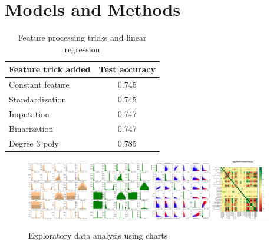 \documentclass[10pt,conference,compsocconf]{IEEEtran}
\begin{document}
\section{Models and Methods}
\begin{table}[!htb]
	\caption{Feature processing tricks and linear regression}	\label{tab:feature_proc}
	\centering\begin{tabular}{|lc|}\hline
		{\bf Feature trick added} & {\bf Test accuracy}\\\hline
		Constant feature & 0.745\\
		Standardization & 0.745\\
		Imputation & 0.747\\
		Binarization & 0.747\\
		Degree 3 poly & 0.785\\\hline
	\end{tabular}
\end{table}

\begin{figure}[!htb]
	\centering \includegraphics[width=100px]{../src/analysis/xy_tr_imp}
	\centering \includegraphics[width=100px]{../src/analysis/hist_te_imp}
	\centering \includegraphics[width=100px]{../src/analysis/hist-scatter-tr-imp-0}
	\centering \includegraphics[width=100px]{../src/analysis/correlation}
	\caption{Exploratory data analysis using charts}
	\label{fig:data}
\end{figure}
\end{document}
